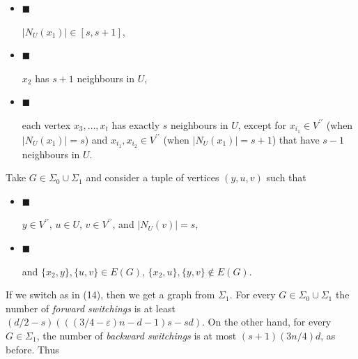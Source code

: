 \documentclass[10pt,a4paper]{article}
\begin{document}
\begin{itemize}


\item[] 
$\blacksquare$ 


$|N_{U}(x_{1})|\in[s,s+1]$,\par





\item[] 
$\blacksquare$ 


$x_{2}$ has $s+1$ neighbours in $U$,\par





\item[] 
$\blacksquare$ 


each vertex $x_{3},\ldots,x_{t}$ has exactly $s$ neighbours in $U$, except for $x_{i_{1}}\in V^{\prime\prime}$ (when $|N_{U}(x_{1})|=s$) and $x_{i_{1}},x_{i_{2}}\in V^{\prime\prime}$ (when $|N_{U}(x_{1})|=s+1$) that have $s-1$ neighbours in $U$.\par





\end{itemize}


Take $G\in\Sigma_{0}\cup\Sigma_{1}$ and consider a tuple of vertices $(y,u,v)$ such that\par


\begin{itemize}


\item[] 
$\blacksquare$ 


$y\in V^{\prime\prime}$, $u\in U$, $v\in V^{\prime\prime}$, and $|N_{U}(v)|=s$,\par





\item[] 
$\blacksquare$ 


and $\{x_{2},y\},\{u,v\}\in E(G)$, $\{x_{2},u\},\{y,v\}\notin E(G)$.\par





\end{itemize}


If we switch as in (14), then
we get a graph from $\Sigma_{1}$. For every $G\in\Sigma_{0}\cup\Sigma_{1}$ the number of \emph{forward switchings} is at least $(d/2-s)(((3/4-\varepsilon)n-d-1)s-sd)$. On the other hand, for every $G\in\Sigma_{1}$, the number of \emph{backward switchings} is at most $(s+1)(3n/4)d$, as before. Thus\par
\end{document}
